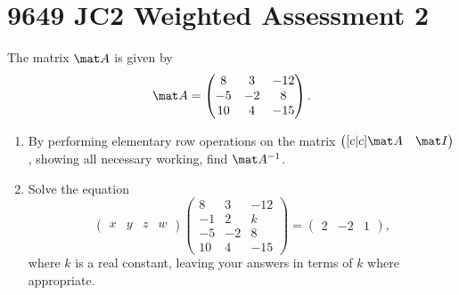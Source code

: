 \section{9649 JC2 Weighted Assessment 2}

\begin{problem}
    The matrix $\mat A$ is given by \[\mat A = \begin{pmatrix}8 & 3 & -12 \\ -5 & -2 & 8 \\ 10 & 4 & -15\end{pmatrix}.\]
    
    \begin{enumerate}
        \item By performing elementary row operations on the matrix $\begin{pmatrix}[c|c] \mat A & \mat I\end{pmatrix}$, showing all necessary working, find $\mat A^{-1}$.
        \item Solve the equation \[\begin{pmatrix}x & y & z & w\end{pmatrix} \begin{pmatrix}8 & 3 & -12 \\ -1 & 2 & k \\ -5 & -2 & 8 \\ 10 & 4 & -15\end{pmatrix} = \begin{pmatrix}2 & -2 & 1\end{pmatrix},\] where $k$ is a real constant, leaving your answers in terms of $k$ where appropriate.
    \end{enumerate}
\end{problem}
